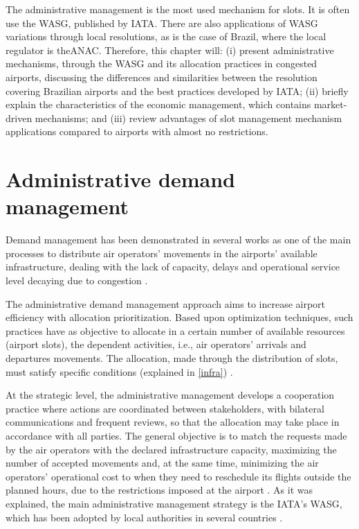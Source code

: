 The administrative management is the most used mechanism for slots. It is often use the \acrfull{WASG}, published by \acrshort{IATA}\cite{ribeiro2018optimization}. There are also applications of \acrshort{WASG} variations through local resolutions, as is the case of Brazil, where the local regulator is the\acrfull{ANAC}. Therefore, this chapter will: (i) present administrative mechanisms, through the \acrshort{WASG} and its allocation practices in congested airports, discussing the differences and similarities between the resolution covering Brazilian airports and the best practices developed by \acrshort{IATA}; (ii) briefly explain the characteristics of the economic management, which contains market-driven mechanisms; and (iii) review advantages of slot management mechanism applications compared to airports with almost no restrictions.

\section{Administrative demand management}
Demand management has been demonstrated in several works as one of the main processes to distribute air operators’ movements in the airports’ available infrastructure, dealing with the lack of capacity, delays and operational service level decaying due to congestion \cite{zografos2017increasing, ribeiro2018optimization}.

The administrative demand management approach aims to increase airport efficiency with allocation prioritization. Based upon optimization techniques, such practices have as objective to allocate in a certain number of available resources (airport slots), the dependent activities, i.e., air operators’ arrivals and departures movements. The allocation, made through the distribution of slots, must satisfy specific conditions (explained in \ref{infra}) \cite{zografos2017increasing}.

At the strategic level, the administrative management develops a cooperation practice where actions are coordinated between stakeholders, with bilateral communications and frequent reviews, so that the allocation may take place in accordance with all parties. The general objective is to match the requests made by the air operators with the declared infrastructure capacity, maximizing the number of accepted movements and, at the same time, minimizing the air operators’ operational cost to when they need to reschedule its flights outside the planned hours, due to the restrictions imposed at the airport \cite {gillen2016airport}. As it was explained, the main administrative management strategy is the \acrshort{IATA}’s \acrshort{WASG}, which has been adopted by local authorities in several countries \cite{zografos2017increasing, fairbrother2018development, cavusoglu2021minimum}.

